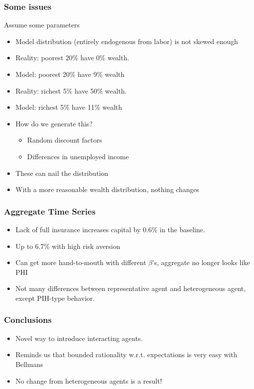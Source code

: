 \documentclass{beamer}
\begin{document}
\begin{frame}
\frametitle[alignment=center]{Some issues}
Assume some parameters
\begin{itemize}
\item Model distribution (entirely endogenous from labor) is not skewed enough 
\bigskip
\item Reality: poorest 20\% have 0\% wealth.
\item Model: poorest 20\% have 9\% wealth
\item Reality: richest 5\% have 50\% wealth.
\item Model: richest 5\% have 11\% wealth
\bigskip
\item How do we generate this?  
\begin{itemize}
\item Random discount factors
\item Differences in unemployed income
\end{itemize}
\item These can nail the distribution
\item With a more reasonable wealth distribution, nothing changes 
\end{itemize}
\end{frame}

\begin{frame}
\frametitle[alignment=center]{Aggregate Time Series}
\begin{itemize}
\bigskip
\item Lack of full insurance increases capital by 0.6\% in the baseline.
\bigskip
\item Up to 6.7\% with high risk aversion
\bigskip
\item Can get more hand-to-mouth with different $\beta$'s, aggregate no longer looks like PHI
\bigskip
\item Not many differences between representative agent and heterogeneous agent, except PIH-type behavior.
\end{itemize}
\end{frame}

\begin{frame}
\frametitle[alignment=center]{Conclusions}
\begin{itemize}
\bigskip
\item Novel way to introduce interacting agents.
\bigskip
\item Reminds us that bounded rationality w.r.t. expectations is very easy with Bellmans
\bigskip
\item No change from heterogeneous agents is a result!
\end{itemize}
\end{frame}
\end{document}
